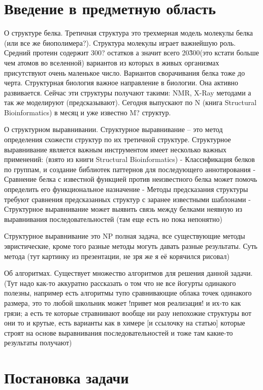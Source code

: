 \documentclass[a4paper, 14pt, titlepage, utf8]{extarticle}
\begin{document}
\section{Введение в предметную область}

О структуре белка.
Третичная структура это трехмерная модель молекулы белка (или все же биополимера?). Структура молекулы играет важнейшую роль. Средний протеин содержит 300? остатков а значит всего 20\^300(это кстати больше чем атомов во вселенной) вариантов из которых в живых организмах присутствуют очень маленькое число. Вариантов сворачивания белка тоже до черта. Структурная биология важное направление в биологии. Она активно развивается. Сейчас эти структуры получают такими: NMR, X-Ray методами а так же моделируют (предсказывают). Сегодня выпускают по N (книга Structural Bioinformatics) в месяц и уже известно M? структур.

О структурном выравнивании.
Структурное выравнивание -- это метод определения схожести структур по их третичной структуре.%
Структурное выравнивание является важным инструментом имеет несколько важных применений:
	(взято из книги Structural Bioinformatics)
	- Классификация белков по группам, и создание библиотек паттернов для последующего аннотирования
	- Сравнение белка с известной функцией против неизвестного белка может помочь определить его функциональное назначение 
	- Методы предсказания структуры требуют сравнения предсказанных структур с заранее известными шаблонами
	- Структурное выравнивание может выявить связь между белками неявную из выравнивания последовательностей (там еще есть но пока непонятно)

Структурное выравнивание это NP полная задача, все существующие методы эвристические, кроме того разные методы могуть давать разные результаты.
Суть метода (тут картинку из презентации, не зря же я её корячился рисовал)

Об алгоритмах.
Существует множество алгоритмов для решения данной задачи. (Тут надо как-то аккуратно рассказать о том что не все йогурты одинакого полезны, например есть алгоритмы тупо сравнивающие облака точек одинакого размера, это то любой школьник может !привет моя реализация! и их-то как грязи; а есть те которые стравнивают вообще ни разу непохожие структуры вот они то и крутые, есть варианты как в химере [и ссылочку на статью] которые строят на основе выравнивания последовательностей и тоже там какие-то результаты получают)
 
\section{Постановка задачи}
\end{document}
